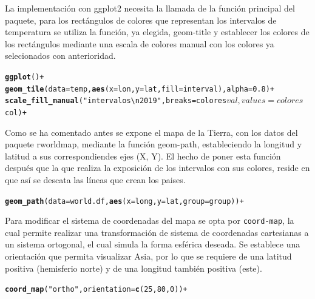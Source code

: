 \documentclass{article}\usepackage[]{graphicx}\usepackage[]{color}
\makeatletter
\newcommand{\hlstr}[1]{\textcolor[rgb]{0.192,0.494,0.8}{#1}}%
\newcommand{\hlkwd}[1]{\textcolor[rgb]{0.737,0.353,0.396}{\textbf{#1}}}%
\newenvironment{kframe}{%
 \def\at@end@of@kframe{}%
 \ifinner\ifhmode%
  \def\at@end@of@kframe{\end{minipage}}%
  \begin{minipage}{\columnwidth}%
 \fi\fi%
 \def\FrameCommand##1{\hskip\@totalleftmargin \hskip-\fboxsep
 \colorbox{shadecolor}{##1}\hskip-\fboxsep
     \hskip-\linewidth \hskip-\@totalleftmargin \hskip\columnwidth}%
 \MakeFramed {\advance\hsize-\width
   \@totalleftmargin\z@ \linewidth\hsize
   \@setminipage}}%
 {\par\unskip\endMakeFramed%
 \at@end@of@kframe}
\newenvironment{knitrout}{}{} %
\makeatother
\begin{document}
La implementaci\'on con ggplot2 necesita la llamada de la funci\'on principal del paquete, para los rect\'angulos de colores que representan los intervalos de temperatura se utiliza la funci\'on, ya elegida, geom-title y establecer los colores de los rect\'angulos mediante una escala de colores manual con los colores ya selecionados con anterioridad. 
\begin{knitrout}
\color{fgcolor}\begin{kframe}
\begin{alltt}
\hlkwd{ggplot}() + 
    \hlkwd{geom_tile}(data = temp, \hlkwd{aes}(x = lon, y = lat, fill = interval), alpha = 0.8) +
    \hlkwd{scale_fill_manual}(\hlstr{"intervalos\textbackslash{}n 2019"}, breaks = colores$val, values = colores$col) +
\end{alltt}
\end{kframe}
\end{knitrout}
Como se ha comentado antes se expone el mapa de la Tierra, con los datos del paquete rworldmap, mediante la funci\'on geom-path, estableciendo la longitud y latitud a sus correspondiendes ejes (X, Y). El hecho de poner esta funci\'on despu\'es que la que realiza la exposici\'on de los intervalos con sus colores, reside en que as\'i se descata las l\'ineas que crean los paises.
\begin{knitrout}
\color{fgcolor}\begin{kframe}
\begin{alltt}
    \hlkwd{geom_path}(data = world.df, \hlkwd{aes}(x = long, y = lat, group = group)) +
\end{alltt}
\end{kframe}
\end{knitrout}
Para modificar el sistema de coordenadas del mapa se opta por \texttt{coord-map}, la cual permite realizar una transformaci\'on de sistema de coordenadas cartesianas a un sistema ortogonal, el cual simula la forma esf\'erica deseada. Se establece una orientaci\'on que permita visualizar Asia, por lo que se requiere de una latitud positiva (hemisferio norte) y de una longitud tambi\'en positiva (este).
\begin{knitrout}
\color{fgcolor}\begin{kframe}
\begin{alltt}
    \hlkwd{coord_map}(\hlstr{"ortho"}, orientation=\hlkwd{c}(25, 80, 0)) +
\end{alltt}
\end{kframe}
\end{knitrout}
\end{document}
